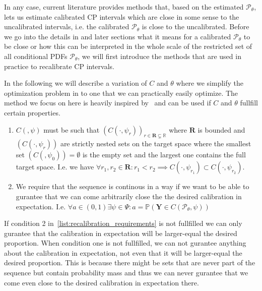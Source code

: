 In any case, current literature provides methods that, based on the estimated $\mathscr{P}_{\theta}$, lets us estimate calibrated CP intervals which are close in some sense to the uncalibrated intervals, i.e. the calibrated $\mathscr{P}_{\theta}$ is close to the uncalibrated. Before we go into the details in  and later sections what it means for a calibrated $\mathscr{P}_{\theta}$ to be close or how this can be interpreted in the whole scale of the restricted set of all conditional PDFs $\mathscr{P}_{\theta}$, we will first introduce the methods that are used in practice to recalibrate CP intervals.

In the following we will describe a variation of $C$ and $\theta$ where we simplify the optimization problem in  to one that we can practically easily optimize. The method we focus on here is heavily inspired by~\cite{sesia2021conformal} and can be used if $C$ and $\theta$ fullfill certain properties.

\begin{enumerate}\label{list:recalibration_requirements}%
    \item $C(,\psi)$ must be such that $\left(C\left(\cdot, \psi_r\right)\right)_{r \in \mathbf{R} \subsetneq \mathbb{R}}$ where $\mathbf{R}$ is bounded and $(C(\cdot,\psi_r))$ are strictly nested sets on the target space where the smallest set $(C(,\psi_0)) = \emptyset$ is the empty set and the largest one contains the full target space. I.e. we have $\forall r_1, r_2 \in \mathbf{R}: r_1 < r_2 \implies C(\cdot,\psi_{r_1}) \subset C(\cdot, \psi_{r_2})$.
    \item We require that the sequence is continous in a way if we want to be able to gurantee that we can come arbitrarily close the the desired calibration in expectation. I.e. $\forall a\in(0,1) \exists \psi\in\Psi : a = \mathbb{P}(\mathbf{Y} \in C(\mathscr{P}_{\theta}, \psi))$
\end{enumerate}

If condition 2 in~\ref{list:recalibration_requirements} is not fullfilled we can only gurantee that the calibration in expectation will be larger-equal the desired proportion. When condition one is not fullfilled, we can not gurantee anything about the calibration in expectation, not even that it will be larger-equal the desired proportion. This is because there might be sets that are never part of the sequence but contain probability mass and thus we can never gurantee that we come even close to the desired calibration in expectation there.

